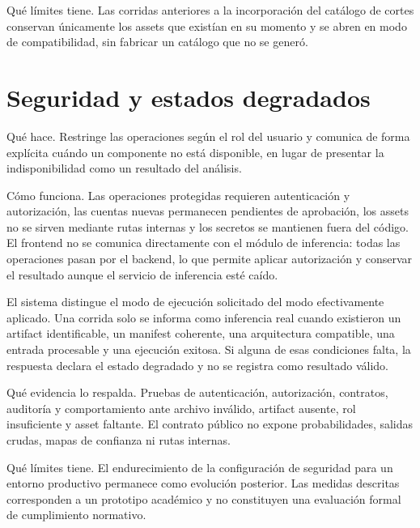 Qué límites tiene. Las corridas anteriores a la incorporación del catálogo de cortes conservan únicamente los assets que existían en su momento y se abren en modo de compatibilidad, sin fabricar un catálogo que no se generó.

\section{Seguridad y estados degradados}

Qué hace. Restringe las operaciones según el rol del usuario y comunica de forma explícita cuándo un componente no está disponible, en lugar de presentar la indisponibilidad como un resultado del análisis.

Cómo funciona. Las operaciones protegidas requieren autenticación y autorización, las cuentas nuevas permanecen pendientes de aprobación, los assets no se sirven mediante rutas internas y los secretos se mantienen fuera del código. El frontend no se comunica directamente con el módulo de inferencia: todas las operaciones pasan por el backend, lo que permite aplicar autorización y conservar el resultado aunque el servicio de inferencia esté caído.

El sistema distingue el modo de ejecución solicitado del modo efectivamente aplicado. Una corrida solo se informa como inferencia real cuando existieron un artifact identificable, un manifest coherente, una arquitectura compatible, una entrada procesable y una ejecución exitosa. Si alguna de esas condiciones falta, la respuesta declara el estado degradado y no se registra como resultado válido.


Qué evidencia lo respalda. Pruebas de autenticación, autorización, contratos, auditoría y comportamiento ante archivo inválido, artifact ausente, rol insuficiente y asset faltante. El contrato público no expone probabilidades, salidas crudas, mapas de confianza ni rutas internas.

Qué límites tiene. El endurecimiento de la configuración de seguridad para un entorno productivo permanece como evolución posterior. Las medidas descritas corresponden a un prototipo académico y no constituyen una evaluación formal de cumplimiento normativo.

